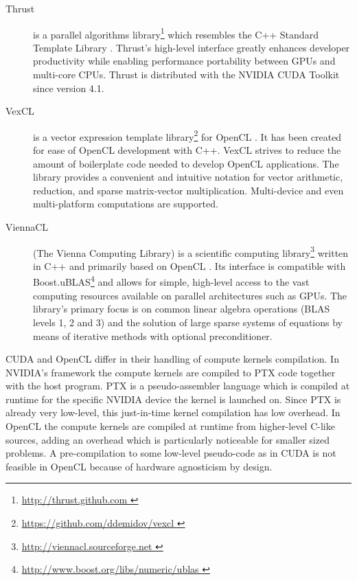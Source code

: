 \documentclass[final]{siamltex}
\begin{document}
\begin{description}
    \item[Thrust] is a parallel algorithms library\footnote{ \href{
        http://thrust.github.com }{ http://thrust.github.com }} which resembles
        the C++ Standard Template Library \cite{ThrustRef}.  Thrust's
        high-level interface greatly enhances developer productivity while
        enabling performance portability between GPUs and multi-core CPUs.
        Thrust is distributed with the NVIDIA CUDA Toolkit since version 4.1.
    \item[VexCL] is a vector expression template
        library\footnote{ \href{ https://github.com/ddemidov/vexcl }{
        https://github.com/ddemidov/vexcl }} for OpenCL \cite{VexCLRef}. It has
        been created for ease of OpenCL development with C++.  VexCL strives to
        reduce the amount of boilerplate code needed to develop OpenCL
        applications. The library provides a convenient and intuitive notation
        for vector arithmetic, reduction, and sparse matrix-vector
        multiplication.  Multi-device and even multi-platform computations are
        supported.
    \item[ViennaCL] (The Vienna Computing Library) is a scientific computing
        library\footnote{ \href{ http://viennacl.sourceforge.net }{
        http://viennacl.sourceforge.net }} written in C++ and primarily based on OpenCL
        \cite{ViennaCLRef}. Its interface is compatible with
        Boost.uBLAS\footnote{ \href{ http://www.boost.org/libs/numeric/ublas }
        { http://www.boost.org/libs/numeric/ublas } }
        and allows for simple, high-level access to the vast
        computing resources available on parallel architectures such as GPUs.
        The library's primary focus is on common linear algebra operations (BLAS
        levels 1, 2 and 3) and the solution of large sparse systems of equations by
        means of iterative methods with optional preconditioner.
\end{description}

CUDA and OpenCL differ in their handling of compute kernels compilation. In
NVIDIA's framework the compute kernels are compiled to PTX code together with
the host program. PTX is a pseudo-assembler language which is compiled at
runtime for the specific NVIDIA device the kernel is launched on. Since PTX is
already very low-level, this just-in-time kernel compilation has low overhead.
In OpenCL the compute kernels are compiled at runtime from higher-level C-like
sources, adding an overhead which is particularly noticeable for smaller
sized problems. A pre-compilation to some low-level pseudo-code as in CUDA is
not feasible in OpenCL because of hardware agnosticism by design.
\end{document}
